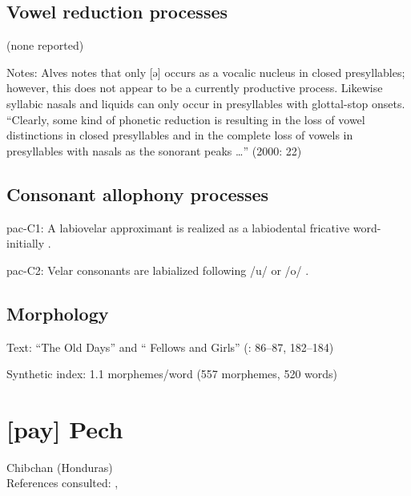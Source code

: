 {\subsection*{Vowel reduction processes}

(none reported)
\begin{appendixdesc}

\item[Notes:] Alves notes that only [ə] occurs as a vocalic nucleus in closed presyllables; however, this does not appear to be a currently productive process. Likewise syllabic nasals and liquids can only occur in presyllables with glottal-stop onsets. “Clearly, some kind of phonetic reduction is resulting in the loss of vowel distinctions in closed presyllables and in the complete loss of vowels in presyllables with nasals as the sonorant peaks …” (2000: 22)
\end{appendixdesc}
\subsection*{Consonant allophony processes}
\begin{appendixdesc}

\item[pac-C1:] A labiovelar approximant is realized as a labiodental fricative word-initially \citep[11]{Alves2006}.

\item[pac-C2:] Velar consonants are labialized following /u/ or /o/ \citep[12]{Alves2006}.
\end{appendixdesc}
\subsection*{Morphology}

\begin{appendixdesc}

\item[Text:] “The Old Days” and “ Fellows and Girls” (\citealt{Watson1980}: 86--87, 182--184)

\item[Synthetic index:] 1.1 morphemes/word (557 morphemes, 520 words)
\end{appendixdesc}
\section*{[pay] Pech}  %
Chibchan (Honduras)\medskip\\
References consulted: \citet{Holt1986}, \citet{Holt1999}

}
